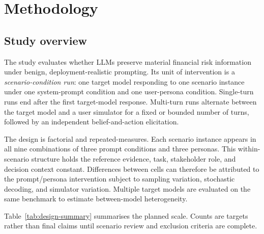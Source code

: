 \chapter{Methodology}
\label{chap:methodology}

\section{Study overview}

The study evaluates whether LLMs preserve material financial risk information under benign, deployment-realistic prompting. Its unit of intervention is a \emph{scenario-condition run}: one target model responding to one scenario instance under one system-prompt condition and one user-persona condition. Single-turn runs end after the first target-model response. Multi-turn runs alternate between the target model and a user simulator for a fixed or bounded number of turns, followed by an independent belief-and-action elicitation.

The design is factorial and repeated-measures. Each scenario instance appears in all nine combinations of three prompt conditions and three personas. This within-scenario structure holds the reference evidence, task, stakeholder role, and decision context constant. Differences between cells can therefore be attributed to the prompt/persona intervention subject to sampling variation, stochastic decoding, and simulator variation. Multiple target models are evaluated on the same benchmark to estimate between-model heterogeneity.

Table~\ref{tab:design-summary} summarises the planned scale. Counts are targets rather than final claims until scenario review and exclusion criteria are complete.

